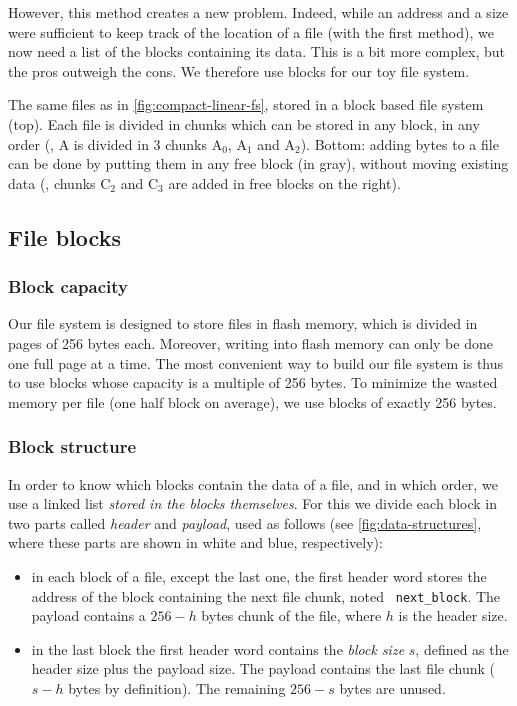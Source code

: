 However, this method creates a new problem. Indeed, while an address and a size
were sufficient to keep track of the location of a file (with the first
method), we now need a list of the blocks containing its data. This is a bit
more complex, but the pros outweigh the cons. We therefore use blocks for our
toy file system.

\begin{Figure}
  

  \caption{The same files as in \cref{fig:compact-linear-fs}, stored in a block
  based file system (top). Each file is divided in chunks which can be stored
  in any block, in any order (\eg, A is divided in 3 chunks A$_0$, A$_1$ and
  A$_2$). Bottom: adding bytes to a file can be done by putting them in any
  free block (in gray), without moving existing data (\eg, chunks C$_2$ and
  C$_3$ are added in free blocks on the right).}\label{fig:block-fs}
\end{Figure}

\subsection{File blocks}\label{subsection:file-blocks}

\subsubsection{Block capacity}

Our file system is designed to store files in flash memory, which is divided in
pages of 256 bytes each. Moreover, writing into flash memory can only be done
one full page at a time. The most convenient way to build our file system is
thus to use blocks whose capacity is a multiple of 256 bytes. To minimize the
wasted memory per file (one half block on average), we use blocks of exactly
256 bytes.

\subsubsection{Block structure}

In order to know which blocks contain the data of a file, and in which order,
we use a linked list {\em stored in the blocks themselves}. For this we divide
each block in two parts called {\em header} and {\em payload}, used as follows
(see \cref{fig:data-structures}, where these parts are shown in white and blue,
respectively):
\begin{itemize}
  \item in each block of a file, except the last one, the first header word
  stores the address of the block containing the next file chunk, noted {\tt
  next\_block}. The payload contains a $256-h$ bytes chunk of the file, where
  $h$ is the header size.

  \item in the last block the first header word contains the {\em block size}
  $s$, defined as the header size plus the payload size. The payload contains
  the last file chunk ($s-h$ bytes by definition). The remaining $256-s$ bytes
  are unused.
\end{itemize}

